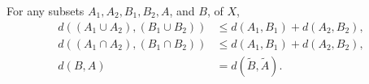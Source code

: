 For any subsets $A_1, A_2, B_1, B_2, A$, and $B$, of $X$,
\begin{align*}
d((A_1 \cup A_2), (B_1 \cup B_2)) &\leq d(A_1, B_1) + d(A_2, B_2),\\
d((A_1 \cap A_2), (B_1 \cap B_2)) &\leq d(A_1, B_1) + d(A_2, B_2),\\
d(B, A) &= d(\tilde{B}, \tilde{A}).
\end{align*}
